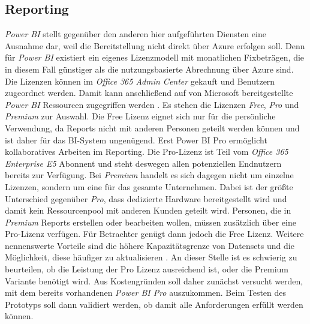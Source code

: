 \subsection{Reporting} \label{subsec:infra:konfig:powerbi}
\textit{Power BI} stellt gegenüber den anderen hier aufgeführten Diensten eine Ausnahme dar, weil die Bereitstellung nicht direkt über Azure erfolgen soll. Denn für  \textit{Power BI} existiert ein eigenes Lizenzmodell mit monatlichen Fixbeträgen, die in diesem Fall günstiger als die nutzungsbasierte Abrechnung über Azure sind. Die Lizenzen können im \textit{Office 365 Admin Center} gekauft und Benutzern zugeordnet werden. Damit kann anschließend auf von Microsoft bereitgestellte \textit{Power BI} Ressourcen zugegriffen werden \cite[vgl.][]{gunnarsson_pro_2020}. Es stehen die Lizenzen \textit{Free}, \textit{Pro} und \textit{Premium} zur Auswahl. Die Free Lizenz eignet sich nur für die persönliche Verwendung, da Reports nicht mit anderen Personen geteilt werden können und ist daher für das BI-System ungenügend. Erst Power BI Pro ermöglicht kollaboratives Arbeiten im Reporting. Die Pro-Lizenz ist Teil vom \textit{Office 365 Enterprise E5} Abonnent und steht deswegen allen potenziellen Endnutzern bereits zur Verfügung. Bei \textit{Premium} handelt es sich dagegen nicht um einzelne Lizenzen, sondern um eine für das gesamte Unternehmen. Dabei ist der größte Unterschied gegenüber \textit{Pro}, dass dedizierte Hardware bereitgestellt wird und damit kein Ressourcenpool mit anderen Kunden geteilt wird. Personen, die in \textit{Premium} Reports erstellen oder bearbeiten wollen, müssen zusätzlich über eine Pro-Lizenz verfügen. Für Betrachter genügt dann jedoch die Free Lizenz. Weitere nennenswerte Vorteile sind die höhere Kapazitätsgrenze von Datensets und die Möglichkeit, diese häufiger zu aktualisieren \cite[vgl.][]{gunnarsson_pro_2020}. An dieser Stelle ist es schwierig zu beurteilen, ob die Leistung der Pro Lizenz ausreichend ist, oder die Premium Variante benötigt wird. Aus Kostengründen soll daher zunächst versucht werden, mit dem bereits vorhandenen \textit{Power BI Pro} auszukommen. Beim Testen des Prototyps soll dann validiert werden, ob damit alle Anforderungen erfüllt werden können.

